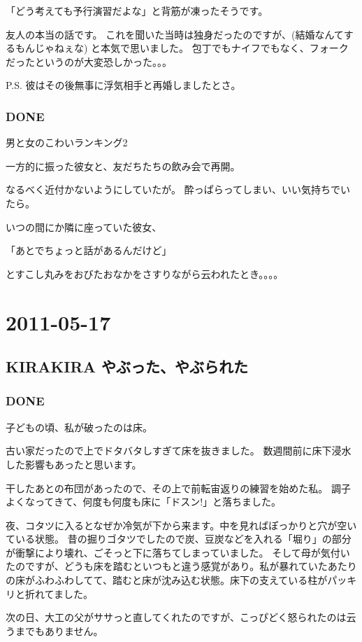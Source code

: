 \documentclass[11pt]{article}
\begin{document}
「どう考えても予行演習だよな」と背筋が凍ったそうです。

友人の本当の話です。
これを聞いた当時は独身だったのですが、(結婚なんてするもんじゃねぇな) と本気で思いました。
包丁でもナイフでもなく、フォークだったというのが大変恐しかった。。。

P.S. 彼はその後無事に浮気相手と再婚しましたとさ。
\subsubsection{\textbf{DONE}}
\label{sec-122_2_3}

男と女のこわいランキング2

一方的に振った彼女と、友だちたちの飲み会で再開。

なるべく近付かないようにしていたが。
酔っぱらってしまい、いい気持ちでいたら。

いつの間にか隣に座っていた彼女、

「あとでちょっと話があるんだけど」

とすこし丸みをおびたおなかをさすりながら云われたとき。。。。
\section{2011-05-17}
\label{sec-123}
\subsection{KIRAKIRA やぶった、やぶられた}
\label{sec-123_1}
\subsubsection{\textbf{DONE}}
\label{sec-123_1_1}

子どもの頃、私が破ったのは床。

古い家だったので上でドタバタしすぎて床を抜きました。
数週間前に床下浸水した影響もあったと思います。

干したあとの布団があったので、その上で前転宙返りの練習を始めた私。
調子よくなってきて、何度も何度も床に「ドスン!」と落ちました。

夜、コタツに入るとなぜか冷気が下から来ます。中を見ればぽっかりと穴が空いている状態。
昔の掘りゴタツでしたので炭、豆炭などを入れる「堀り」の部分が衝撃により壊れ、ごそっと下に落ちてしまっていました。
そして母が気付いたのですが、どうも床を踏むといつもと違う感覚があり。私が暴れていたあたりの床がふわふわしてて、踏むと床が沈み込む状態。床下の支えている柱がパッキリと折れてました。

次の日、大工の父がササっと直してくれたのですが、こっぴどく怒られたのは云うまでもありません。
\end{document}
